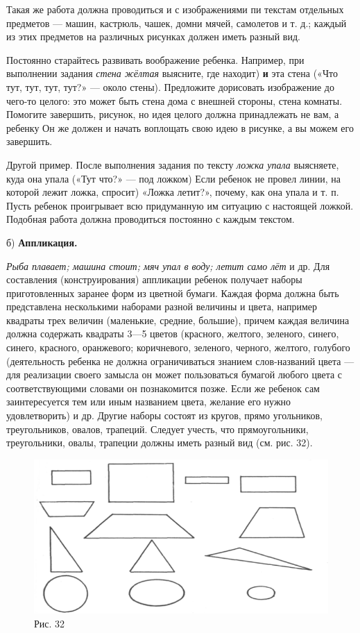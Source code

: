 \documentclass{book}
\renewcommand{\emph}[1]{\textit{#1}}
\begin{document}
Такая же работа должна проводиться и с изображениями пи текстам
отдельных предметов --- машин, кастрюль, чашек, домни мячей, самолетов и
т. д.; каждый из этих предметов на различных рисунках должен иметь
разный вид.

Постоянно старайтесь развивать воображение ребенка. Например, при
выполнении задания \emph{стена жёлтая} выясните, где находит) \textbf{и}
эта стена («Что тут, тут, тут, тут?» --- около стены). Предложите
дорисовать изображение до чего-то целого: это может быть стена дома с
внешней стороны, стена комнаты. Помогите завершить, рисунок, но идея
целого должна принадлежать не вам, а ребенку Он же должен и начать
воплощать свою идею в рисунке, а вы можем его завершить.

Другой пример. После выполнения задания по тексту \emph{ложка упала}
выясняете, куда она упала («Тут что?» --- под ложком) Если ребенок не
провел линии, на которой лежит ложка, спросит) «Ложка летит?», почему,
как она упала и т. п. Пусть ребенок проигрывает всю придуманную им
ситуацию с настоящей ложкой. Подобная работа должна проводиться
постоянно с каждым текстом.

б) \textbf{Аппликация.}

\emph{Рыба плавает; машина стоит; мяч упал в воду; летит само лёт} и др.
Для составления (конструирования) аппликации ребенок получает наборы
приготовленных заранее форм из цветной бумаги. Каждая форма должна быть
представлена несколькими наборами разной величины и цвета, например
квадраты трех величин (маленькие, средние, большие), причем каждая
величина должна содержать квадраты 3---5 цветов (красного, желтого,
зеленого, синего, синего, красного, оранжевого; коричневого, зеленого,
черного, желтого, голубого (деятельность ребенка не должна
ограничиваться знанием слов-названий цвета --- для реализации своего
замысла он может пользоваться бумагой любого цвета с соответствующими
словами он познакомится позже. Если же ребенок сам заинтересуется тем
или иным названием цвета, желание его нужно удовлетворить) и др. Другие
наборы состоят из кругов, прямо угольников, треугольников, овалов,
трапеций. Следует учесть, что прямоугольники, треугольники, овалы,
трапеции должны иметь разный вид (см. рис. 32).

\begin{figure}
\centering
\includegraphics[width=\linewidth]{media/media/image29.png}
\caption*{Рис. 32}
\end{figure}
\end{document}
